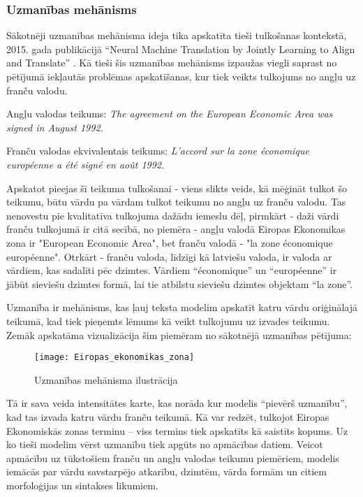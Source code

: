 \subsubsection{Uzmanības mehānisms}
Sākotnēji uzmanības mehānisma ideja tika apskatīta tieši tulkošanas kontekstā, 2015. gada publikācijā “Neural Machine Translation by Jointly Learning to Align and Translate” \cite{bahdanau2016neural}. Kā tieši šis uzmanības mehānisms izpaužas viegli saprast no pētījumā iekļautās problēmas apskatīšanas, kur tiek veikts tulkojums no angļu uz franču valodu.


\noindent Angļu valodas teikums: \textit{The agreement on the European Economic Area was signed in August 1992.}


\noindent Franču valodas ekvivalentais teikums: \textit{L’accord sur la zone économique européenne a été signé en août 1992.}

Apskatot pieejas šī teikuma tulkošanai - viens slikts veids, kā mēģināt tulkot šo teikumu, būtu vārdu pa vārdam tulkot teikumu no angļu uz franču valodu. Tas nenovestu pie kvalitatīva tulkojuma dažādu iemeslu dēļ, pirmkārt - daži vārdi franču tulkojumā ir citā secībā, no piemēra - angļu valodā Eiropas Ekonomikas zona ir "European Economic Area", bet franču valodā - "la zone économique européenne". Otrkārt - franču valoda, līdzīgi kā latviešu valoda, ir valoda ar vārdiem, kas sadalīti pēc dzimtes. Vārdiem “économique” un “européenne” ir jābūt sieviešu dzimtes formā, lai tie atbilstu sieviešu dzimtes objektam “la zone”.

Uzmanība ir mehānisms, kas ļauj teksta modelim apskatīt katru vārdu oriģinālajā teikumā, kad tiek pieņemts lēmums kā veikt tulkojumu uz izvades teikumu. Zemāk apskatāma vizualizācija šim piemēram no sākotnējā uzmanības pētījuma:

\begin{figure}[H]
\texttt{[image: Eiropas\_ekonomikas\_zona]}
\caption{Uzmanības mehānisma ilustrācija \cite{bahdanau2016neural}}
\label{fig:Eiropas_ekonomikas_zona}
\end{figure}

Tā ir sava veida intensitātes karte, kas norāda kur modelis “pievērš uzmanību”, kad tas izvada katru vārdu franču teikumā. Kā var redzēt, tulkojot Eiropas Ekonomiskās zonas terminu – viss termins tiek apskatīts kā saistīts kopums. Uz ko tieši modelim vērst uzmanību tiek apgūts no apmācības datiem. Veicot apmācību uz tūkstošiem franču un angļu valodas teikumu piemēriem, modelis iemācās par vārdu savstarpējo atkarību, dzimtēm, vārda formām un citiem morfoloģijas un sintakses likumiem. 

